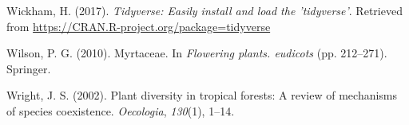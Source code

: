 \documentclass[11pt,]{article}
\begin{document}
\hypertarget{ref-tidyverse}{}
Wickham, H. (2017). \emph{Tidyverse: Easily install and load the
'tidyverse'}. Retrieved from
\url{https://CRAN.R-project.org/package=tidyverse}

\hypertarget{ref-wilson2010myrtaceae}{}
Wilson, P. G. (2010). Myrtaceae. In \emph{Flowering plants. eudicots}
(pp. 212--271). Springer.

\hypertarget{ref-wright2002plant}{}
Wright, J. S. (2002). Plant diversity in tropical forests: A review of
mechanisms of species coexistence. \emph{Oecologia}, \emph{130}(1),
1--14.




\newpage
\singlespacing 
\end{document}
